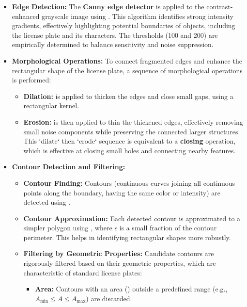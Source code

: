 \begin{itemize}
    \item \textbf{Edge Detection:} The \textbf{Canny edge detector} is applied to the contrast-enhanced grayscale image using . This algorithm identifies strong intensity gradients, effectively highlighting potential boundaries of objects, including the license plate and its characters. The thresholds (100 and 200) are empirically determined to balance sensitivity and noise suppression.
    \item \textbf{Morphological Operations:} To connect fragmented edges and enhance the rectangular shape of the license plate, a sequence of morphological operations is performed:
    \begin{itemize}
        \item \textbf{Dilation:}  is applied to thicken the edges and close small gaps, using a rectangular kernel.
        \item \textbf{Erosion:}  is then applied to thin the thickened edges, effectively removing small noise components while preserving the connected larger structures. This `dilate` then `erode` sequence is equivalent to a \textbf{closing} operation, which is effective at closing small holes and connecting nearby features.
    \end{itemize}
    \item \textbf{Contour Detection and Filtering:}
    \begin{itemize}
        \item \textbf{Contour Finding:} Contours (continuous curves joining all continuous points along the boundary, having the same color or intensity) are detected using .
        \item \textbf{Contour Approximation:} Each detected contour is approximated to a simpler polygon using , where $\epsilon$ is a small fraction of the contour perimeter. This helps in identifying rectangular shapes more robustly.
        \item \textbf{Filtering by Geometric Properties:} Candidate contours are rigorously filtered based on their geometric properties, which are characteristic of standard license plates:
        \begin{itemize}
            \item \textbf{Area:} Contours with an area () outside a predefined range (e.g., $A_{\text{min}} \le A \le A_{\text{max}}$) are discarded.

\end{itemize}
\end{itemize}
\end{itemize}
